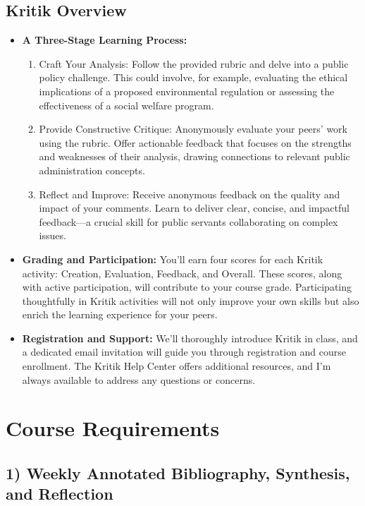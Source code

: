 \documentclass[12pt, letterpaper]{article}
\begin{document}
\subsection*{Kritik Overview}

\begin{itemize}

\item \textbf{A Three-Stage Learning Process:}

\begin{enumerate}
    \item Craft Your Analysis: Follow the provided rubric and delve into a public policy challenge. This could involve, for example, evaluating the ethical implications of a proposed environmental regulation or assessing the effectiveness of a social welfare program.
    \item Provide Constructive Critique: Anonymously evaluate your peers' work using the rubric. Offer actionable feedback that focuses on the strengths and weaknesses of their analysis, drawing connections to relevant public administration concepts.
    \item Reflect and Improve: Receive anonymous feedback on the quality and impact of your comments. Learn to deliver clear, concise, and impactful feedback—a crucial skill for public servants collaborating on complex issues.
\end{enumerate}

\item \textbf{Grading and Participation:} You'll earn four scores for each Kritik activity: Creation, Evaluation, Feedback, and Overall. These scores, along with active participation, will contribute to your course grade. Participating thoughtfully in Kritik activities will not only improve your own skills but also enrich the learning experience for your peers.

\item \textbf{Registration and Support:} We'll thoroughly introduce Kritik in class, and a dedicated email invitation will guide you through registration and course enrollment. The Kritik Help Center offers additional resources, and I'm always available to address any questions or concerns.
\end{itemize}
\section{Course Requirements}
\subsection*{1) Weekly Annotated Bibliography, Synthesis, and Reflection}
\end{document}
